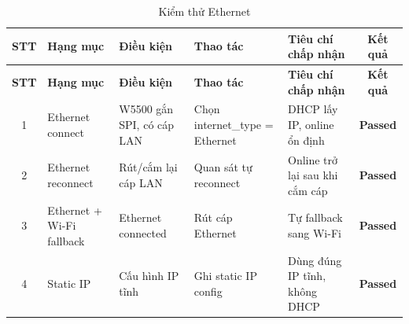         \begin{longtable}{|c|p{}|p{}|p{}|p{}|c|}
            \caption{Kiểm thử Ethernet}
            \label{tab:test_ethernet} \\
            \hline
            \textbf{STT} & \textbf{Hạng mục} & \textbf{Điều kiện} & \textbf{Thao tác} & \textbf{Tiêu chí chấp nhận} & \textbf{Kết quả} \\ \hline
            \endfirsthead
        
            \hline
            \textbf{STT} & \textbf{Hạng mục} & \textbf{Điều kiện} & \textbf{Thao tác} & \textbf{Tiêu chí chấp nhận} & \textbf{Kết quả} \\ \hline
            \endhead
        
            \hline
            \endfoot
            \endlastfoot
        
            1 & Ethernet connect & W5500 gắn SPI, có cáp LAN & Chọn internet\_type = Ethernet & DHCP lấy IP, online ổn định & \textcolor{modern_blue}{\textbf{Passed}} \\ \hline
            2 & Ethernet reconnect & Rút/cắm lại cáp LAN & Quan sát tự reconnect & Online trở lại sau khi cắm cáp & \textcolor{modern_blue}{\textbf{Passed}} \\ \hline
            3 & Ethernet + Wi-Fi fallback & Ethernet connected & Rút cáp Ethernet & Tự fallback sang Wi-Fi & \textcolor{modern_blue}{\textbf{Passed}} \\ \hline
            4 & Static IP & Cấu hình IP tĩnh & Ghi static IP config & Dùng đúng IP tĩnh, không DHCP & \textcolor{modern_blue}{\textbf{Passed}} \\ \hline
        \end{longtable}
        
